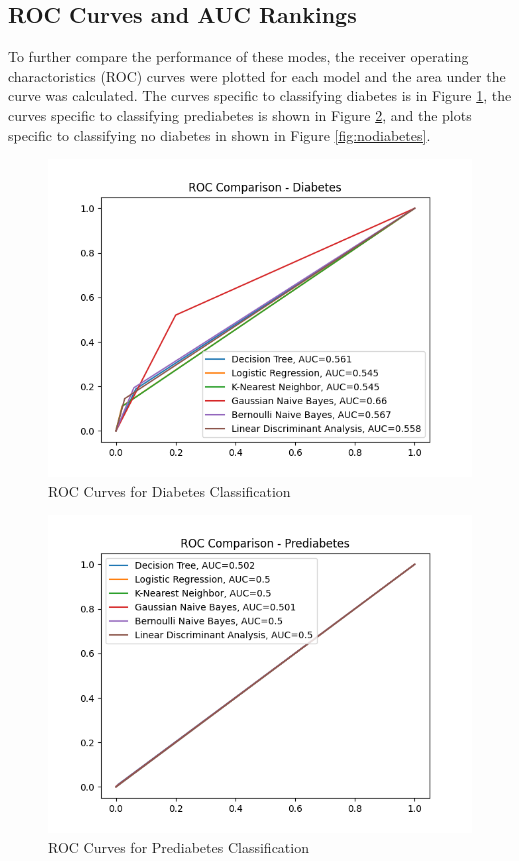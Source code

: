 \documentclass[journal]{IEEEtran}
\begin{document}
\subsection{ROC Curves and AUC Rankings}

To further compare the performance of these modes, the receiver operating charactoristics (ROC) curves were plotted for each model and the area under the curve was calculated. The curves specific to classifying diabetes is in Figure \ref{fig:diabetes}, the curves specific to classifying prediabetes is shown in Figure \ref{fig:prediabetes}, and the plots specific to classifying no diabetes in shown in Figure \ref{fig:nodiabetes}.

\pagebreak

\begin{figure}[h!]
    \includegraphics[scale=0.5]{ROC Comparison - Diabetes.png}
    \centering
    \caption{ROC Curves for Diabetes Classification}
    \label{fig:diabetes}
\end{figure}

\begin{figure}[h!]
    \includegraphics[scale=0.5]{ROC Comparison - Prediabetes.png}
    \centering
    \caption{ROC Curves for Prediabetes Classification}
    \label{fig:prediabetes}
\end{figure}
\end{document}
